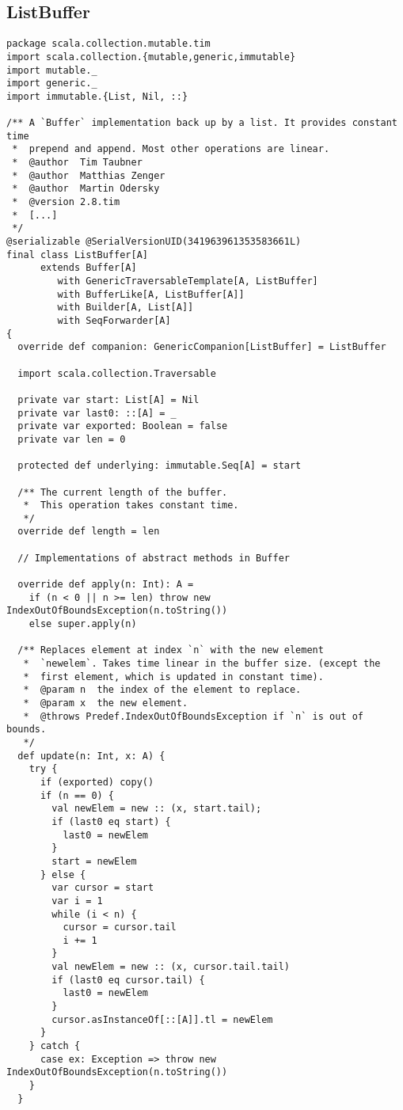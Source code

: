 \clearpage\subsection{ListBuffer}
\begin{lstlisting}
package scala.collection.mutable.tim
import scala.collection.{mutable,generic,immutable}
import mutable._
import generic._
import immutable.{List, Nil, ::}

/** A `Buffer` implementation back up by a list. It provides constant time
 *  prepend and append. Most other operations are linear.
 *  @author  Tim Taubner
 *  @author  Matthias Zenger
 *  @author  Martin Odersky
 *  @version 2.8.tim
 *  [...]
 */
@serializable @SerialVersionUID(341963961353583661L)
final class ListBuffer[A]
      extends Buffer[A]
         with GenericTraversableTemplate[A, ListBuffer]
         with BufferLike[A, ListBuffer[A]]
         with Builder[A, List[A]]
         with SeqForwarder[A]
{
  override def companion: GenericCompanion[ListBuffer] = ListBuffer

  import scala.collection.Traversable

  private var start: List[A] = Nil
  private var last0: ::[A] = _
  private var exported: Boolean = false
  private var len = 0

  protected def underlying: immutable.Seq[A] = start

  /** The current length of the buffer.
   *  This operation takes constant time.
   */
  override def length = len

  // Implementations of abstract methods in Buffer

  override def apply(n: Int): A =
    if (n < 0 || n >= len) throw new IndexOutOfBoundsException(n.toString())
    else super.apply(n)

  /** Replaces element at index `n` with the new element
   *  `newelem`. Takes time linear in the buffer size. (except the
   *  first element, which is updated in constant time).
   *  @param n  the index of the element to replace.
   *  @param x  the new element.
   *  @throws Predef.IndexOutOfBoundsException if `n` is out of bounds.
   */
  def update(n: Int, x: A) {
    try {
      if (exported) copy()
      if (n == 0) {
        val newElem = new :: (x, start.tail);
        if (last0 eq start) {
          last0 = newElem
        }
        start = newElem
      } else {
        var cursor = start
        var i = 1
        while (i < n) {
          cursor = cursor.tail
          i += 1
        }
        val newElem = new :: (x, cursor.tail.tail)
        if (last0 eq cursor.tail) {
          last0 = newElem
        }
        cursor.asInstanceOf[::[A]].tl = newElem
      }
    } catch {
      case ex: Exception => throw new IndexOutOfBoundsException(n.toString())
    }
  }


\end{lstlisting}
